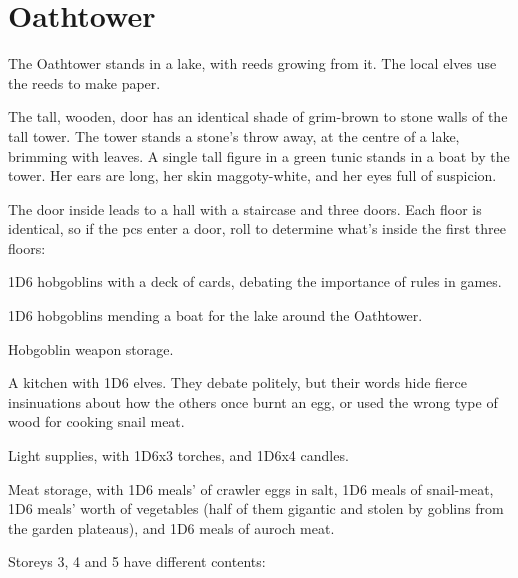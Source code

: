 \section{Oathtower}


\begin{multicols}{2}

The Oathtower stands in a lake, with reeds growing from it.
The local elves use the reeds to make paper.

\begin{boxtext}
  The tall, wooden, door has an identical shade of grim-brown to stone walls of the tall tower.
  The tower stands a stone's throw away, at the centre of a lake, brimming with leaves.
  A single tall figure in a green tunic stands in a boat by the tower.
  Her ears are long, her skin maggoty-white, and her eyes full of suspicion.
\end{boxtext}

The door inside leads to a hall with a staircase and three doors.
Each floor is identical, so if the \glspl{pc} enter a door, roll to determine what's inside the first three floors:

\begin{dlist}
  \item
  1D6 hobgoblins with a deck of cards, debating the importance of rules in games.
  \item
  1D6 hobgoblins mending a boat for the lake around the Oathtower.
  \item
  Hobgoblin weapon storage.
  \item
  A kitchen with 1D6 elves.
  They debate politely, but their words hide fierce insinuations about how the others once burnt an egg, or used the wrong type of wood for cooking snail meat.
  \item
  Light supplies, with 1D6x3 torches, and 1D6x4 candles.
  \item
  Meat storage, with 1D6 meals' of \gls{crawler} eggs in salt, 1D6 meals of snail-meat, 1D6 meals' worth of vegetables (half of them gigantic and stolen by goblins from the garden plateaus), and 1D6 meals of auroch meat.
\end{dlist}

Storeys 3, 4 and 5 have different contents:


\end{multicols}
